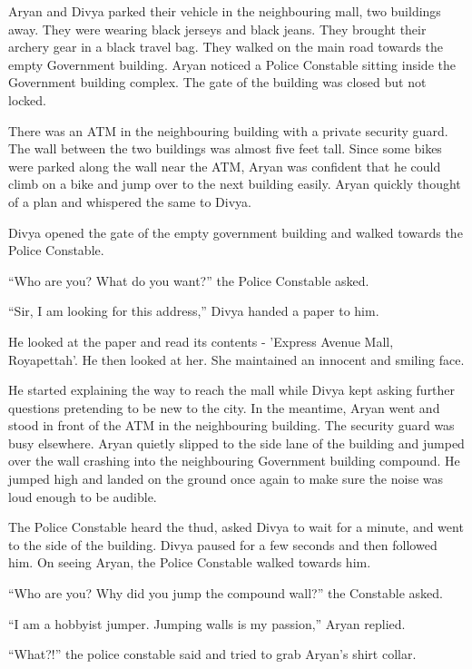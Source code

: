 Aryan and Divya parked their vehicle in the neighbouring mall, two buildings
away. They were wearing black jerseys and black jeans. They brought their
archery gear in a black travel bag. They walked on the main road towards the
empty Government building. Aryan noticed a Police Constable sitting inside the
Government building complex. The gate of the building was closed but not locked.

There was an ATM in the neighbouring building with a private security guard. The
wall between the two buildings was almost five feet tall. Since some bikes were
parked along the wall near the ATM, Aryan was confident that he could climb on a
bike and jump over to the next building easily. Aryan quickly thought of a plan
and whispered the same to Divya.

Divya opened the gate of the empty government building and walked towards the
Police Constable.

“Who are you? What do you want?” the Police Constable asked.

“Sir, I am looking for this address,” Divya handed a paper to him.

He looked at the paper and read its contents - 'Express Avenue Mall,
Royapettah'. He then looked at her. She maintained an innocent and smiling face.

He started explaining the way to reach the mall while Divya kept asking further
questions pretending to be new to the city. In the meantime, Aryan went and
stood in front of the ATM in the neighbouring building. The security guard was
busy elsewhere. Aryan quietly slipped to the side lane of the building and
jumped over the wall crashing into the neighbouring Government building compound.
He jumped high and landed on the ground once again to make sure the noise was
loud enough to be audible.

The Police Constable heard the thud, asked Divya to wait for a minute, and went
to the side of the building. Divya paused for a few seconds and then followed
him. On seeing Aryan, the Police Constable walked towards him.

“Who are you? Why did you jump the compound wall?” the Constable asked.

“I am a hobbyist jumper. Jumping walls is my passion,” Aryan replied.

“What?!” the police constable said and tried to grab Aryan's shirt collar.

